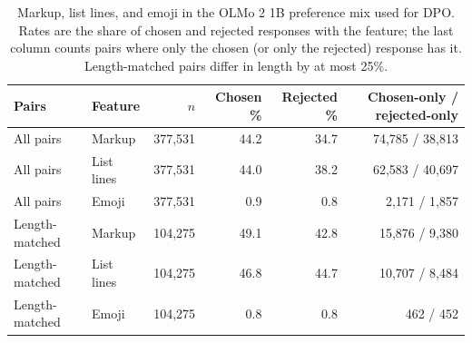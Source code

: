 \begin{table}[t]
\centering
\small
\caption{Markup, list lines, and emoji in the OLMo 2 1B preference mix used for DPO. Rates are the share of chosen and rejected responses with the feature; the last column counts pairs where only the chosen (or only the rejected) response has it. Length-matched pairs differ in length by at most 25\%.}
\label{tab:preference-markdown}
\begin{tabular}{llrrrr}
\toprule
Pairs & Feature & $n$ & Chosen \% & Rejected \% & Chosen-only / rejected-only \\
\midrule
All pairs & Markup & 377,531 & 44.2 & 34.7 & 74,785 / 38,813 \\
All pairs & List lines & 377,531 & 44.0 & 38.2 & 62,583 / 40,697 \\
All pairs & Emoji & 377,531 & 0.9 & 0.8 & 2,171 / 1,857 \\
Length-matched & Markup & 104,275 & 49.1 & 42.8 & 15,876 / 9,380 \\
Length-matched & List lines & 104,275 & 46.8 & 44.7 & 10,707 / 8,484 \\
Length-matched & Emoji & 104,275 & 0.8 & 0.8 & 462 / 452 \\
\bottomrule
\end{tabular}
\end{table}
